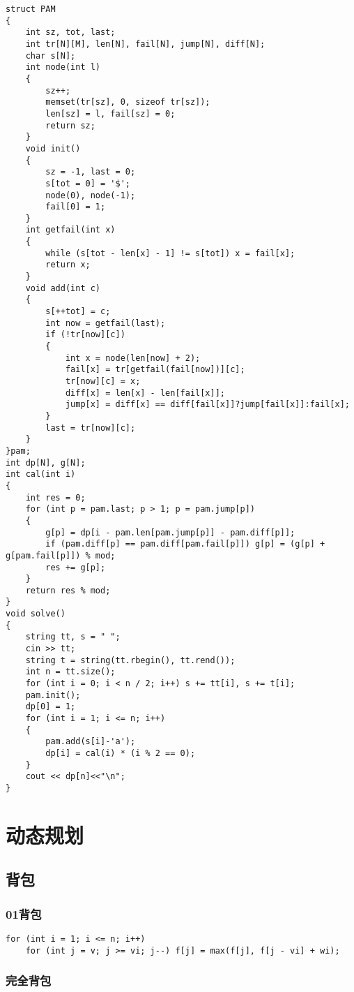 \documentclass[a4paper,fontset=none]{ctexart}
\begin{document}
\begin{verbatim}
struct PAM
{
    int sz, tot, last;
    int tr[N][M], len[N], fail[N], jump[N], diff[N];
    char s[N];
    int node(int l)
    {
        sz++;
        memset(tr[sz], 0, sizeof tr[sz]);
        len[sz] = l, fail[sz] = 0;
        return sz;
    }
    void init()
    {
        sz = -1, last = 0;
        s[tot = 0] = '$';
        node(0), node(-1);
        fail[0] = 1;
    }
    int getfail(int x)
    {
        while (s[tot - len[x] - 1] != s[tot]) x = fail[x];
        return x;
    }
    void add(int c)
    {
        s[++tot] = c;
        int now = getfail(last);
        if (!tr[now][c])
        {
            int x = node(len[now] + 2);
            fail[x] = tr[getfail(fail[now])][c];
            tr[now][c] = x;
            diff[x] = len[x] - len[fail[x]];
            jump[x] = diff[x] == diff[fail[x]]?jump[fail[x]]:fail[x];
        }
        last = tr[now][c];
    }
}pam;
int dp[N], g[N];
int cal(int i)
{
    int res = 0;
    for (int p = pam.last; p > 1; p = pam.jump[p])
    {
        g[p] = dp[i - pam.len[pam.jump[p]] - pam.diff[p]];
        if (pam.diff[p] == pam.diff[pam.fail[p]]) g[p] = (g[p] + g[pam.fail[p]]) % mod;
        res += g[p];
    }
    return res % mod;
}
void solve()
{
    string tt, s = " ";
    cin >> tt;
    string t = string(tt.rbegin(), tt.rend());
    int n = tt.size();
    for (int i = 0; i < n / 2; i++) s += tt[i], s += t[i];
    pam.init();
    dp[0] = 1;
    for (int i = 1; i <= n; i++)
    {
        pam.add(s[i]-'a');
        dp[i] = cal(i) * (i % 2 == 0);
    }
    cout << dp[n]<<"\n";
}
\end{verbatim}

\section{动态规划}
\subsection{背包}
\subsubsection{01背包}

\begin{verbatim}
for (int i = 1; i <= n; i++)
    for (int j = v; j >= vi; j--) f[j] = max(f[j], f[j - vi] + wi);
\end{verbatim}
\subsubsection{完全背包}
\end{document}
